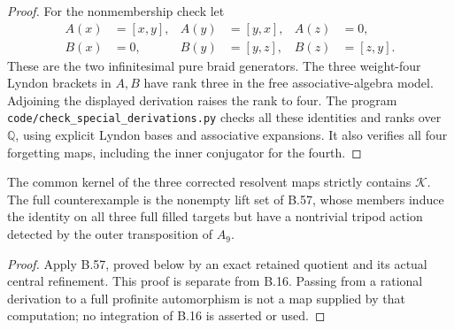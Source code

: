 \begin{proof}
For the nonmembership check let
\[
\begin{aligned}
 A(x)&=[x,y],& A(y)&=[y,x],& A(z)&=0,\\
 B(x)&=0,& B(y)&=[y,z],& B(z)&=[z,y].
\end{aligned}
\]
These are the two infinitesimal pure braid generators.
The three weight-four Lyndon brackets in \(A,B\) have rank three
in the free associative-algebra model. Adjoining the displayed
derivation raises the rank to four. The program
\texttt{code/check\_special\_derivations.py} checks all these
identities and ranks over \(\mathbb Q\), using explicit Lyndon
bases and associative expansions. It also verifies all four
forgetting maps, including the inner conjugator for the fourth.
\end{proof}

The common kernel of the three corrected resolvent maps strictly
contains \(\mathcal K\). The full counterexample is the nonempty
lift set of B.57, whose members induce the identity on all three
full filled targets but have a nontrivial tripod action detected
by the outer transposition of \(A_9\).
\begin{proof}
Apply B.57, proved below by an exact retained quotient and its
actual central refinement. This proof is separate from B.16.
Passing from a rational derivation to a full profinite
automorphism is not a map supplied by that computation; no
integration of B.16 is asserted or used.
\end{proof}
